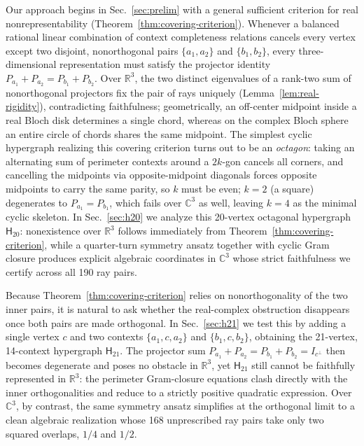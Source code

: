 \documentclass[twocolumn,aps,pra,floatfix,amsmath,amssymb,longbibliography]{revtex4-2}
\newenvironment{handrewrite}{\leavevmode\color{blue}}{}
\theoremstyle{definition}
\theoremstyle{remark}
\newcommand{\C}{\mathbb C}
\newcommand{\R}{\mathbb R}
\newcommand{\Htwenty}{\mathsf H_{20}}
\newcommand{\Htwentyone}{\mathsf H_{21}}
\begin{document}
\begin{handrewrite}
Our approach begins in Sec.~\ref{sec:prelim} with a general sufficient criterion for real nonrepresentability (Theorem~\ref{thm:covering-criterion}).  Whenever a balanced rational linear combination of context completeness relations cancels every vertex except two disjoint, nonorthogonal pairs $\{a_1,a_2\}$ and $\{b_1,b_2\}$, every three-dimensional representation must satisfy the projector identity $P_{a_1}+P_{a_2}=P_{b_1}+P_{b_2}$.  Over $\R^3$, the two distinct eigenvalues of a rank-two sum of nonorthogonal projectors fix the pair of rays uniquely (Lemma~\ref{lem:real-rigidity}), contradicting faithfulness; geometrically, an off-center midpoint inside a real Bloch disk determines a single chord, whereas on the complex Bloch sphere an entire circle of chords shares the same midpoint.  The simplest cyclic hypergraph realizing this covering criterion turns out to be an \emph{octagon}: taking an alternating sum of perimeter contexts around a $2k$-gon cancels all corners, and cancelling the midpoints via opposite-midpoint diagonals forces opposite midpoints to carry the same parity, so $k$ must be even; $k=2$ (a square) degenerates to $P_{a_1}=P_{b_1}$, which fails over $\C^3$ as well, leaving $k=4$ as the minimal cyclic skeleton.  In Sec.~\ref{sec:h20} we analyze this 20-vertex octagonal hypergraph $\Htwenty$: nonexistence over $\R^3$ follows immediately from Theorem~\ref{thm:covering-criterion}, while a quarter-turn symmetry ansatz together with cyclic Gram closure produces explicit algebraic coordinates in $\C^3$ whose strict faithfulness we certify across all 190 ray pairs.

Because Theorem~\ref{thm:covering-criterion} relies on nonorthogonality of the two inner pairs, it is natural to ask whether the real-complex obstruction disappears once both pairs are made orthogonal.  In Sec.~\ref{sec:h21} we test this by adding a single vertex $c$ and two contexts $\{a_1,c,a_2\}$ and $\{b_1,c,b_2\}$, obtaining the 21-vertex, 14-context hypergraph $\Htwentyone$.  The projector sum $P_{a_1}+P_{a_2}=P_{b_1}+P_{b_2}=I_{c^\perp}$ then becomes degenerate and poses no obstacle in $\R^3$, yet $\Htwentyone$ still cannot be faithfully represented in $\R^3$: the perimeter Gram-closure equations clash directly with the inner orthogonalities and reduce to a strictly positive quadratic expression.  Over $\C^3$, by contrast, the same symmetry ansatz simplifies at the orthogonal limit to a clean algebraic realization whose 168 unprescribed ray pairs take only two squared overlaps, $1/4$ and $1/2$.


\end{handrewrite}
\end{document}
